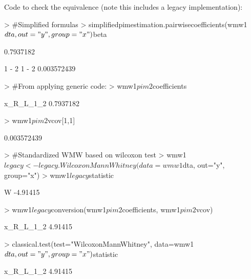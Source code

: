 \documentclass[12pt]{article}
\begin{document}
Code to check the equivalence (note this includes a legacy implementation):
\begin{Schunk}
\begin{Sinput}
> 	#Simplified formulas
> 	simplifiedpimestimation.pairwisecoefficients(wmw1$dta, out="y", group="x")$beta
\end{Sinput}
\begin{Soutput}
[1] 0.7937182
\end{Soutput}
\begin{Soutput}
            1 - 2
1 - 2 0.003572439
\end{Soutput}
\begin{Sinput}
> 	#From applying generic code:
> 	wmw1$pim2$coefficients
\end{Sinput}
\begin{Soutput}
x_R_L_1_2 
0.7937182 
\end{Soutput}
\begin{Sinput}
> 	wmw1$pim2$vcov[1,1]
\end{Sinput}
\begin{Soutput}
[1] 0.003572439
\end{Soutput}
\begin{Sinput}
> 	#Standardized WMW based on wilcoxon test
> 	wmw1$legacy<-legacy.WilcoxonMannWhitney(data=wmw1$dta, out="y", group="x")
> 	wmw1$legacy$statistic
\end{Sinput}
\begin{Soutput}
       W 
-4.91415 
\end{Soutput}
\begin{Sinput}
> 	wmw1$legacy$conversion(wmw1$pim2$coefficients, wmw1$pim2$vcov)
\end{Sinput}
\begin{Soutput}
x_R_L_1_2 
  4.91415 
\end{Soutput}
\begin{Sinput}
> 	classical.test(test="WilcoxonMannWhitney", data=wmw1$dta, out="y", group="x")$statistic
\end{Sinput}
\begin{Soutput}
x_R_L_1_2 
  4.91415 
\end{Soutput}
\end{Schunk}
\end{document}
